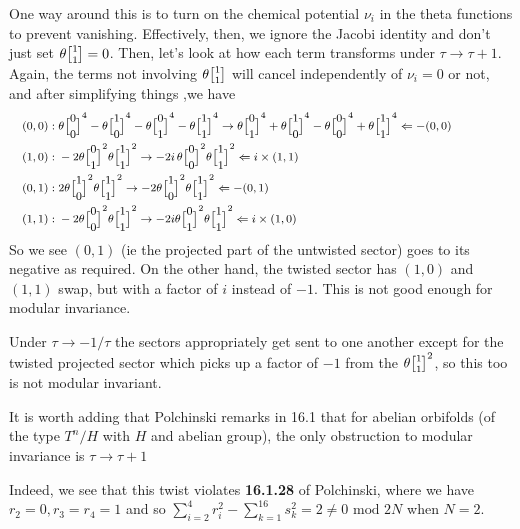 \documentclass[11pt, class=article, crop=false]{standalone}
\begin{document}
\begin{enumerate}
	One way around this is to turn on the chemical potential $\nu_i$ in the theta functions to prevent vanishing. Effectively, then, we ignore the Jacobi identity and don't just set $\theta\twist11 = 0$. Then, let's look at how each term transforms under $\tau \to \tau+1$. Again, the terms not involving $\theta\twist11$ will cancel independently of $\nu_i = 0$ or not, and after simplifying things ,we have
	\[
	\footnotesize
	\hspace{-.5in}
	\begin{aligned}
		(0,0):\;&  \theta\twist00^4 - \theta\twist10^4 - \theta\twist01^4 - \theta\twist11^4 \to \theta\twist01^4 + \theta\twist10^4 - \theta\twist00^4 + \theta\twist11^4 \Leftarrow - (0,0)\\
		(1,0):\;&   - 2 \theta \twist01^2  \theta \twist11^2 \to -2 i\, \theta \twist00^2  \theta \twist11^2  \Leftarrow i \times (1,1) \\
		(0,1):\;&  2 \theta \twist10^2 \theta \twist11^2
		\to -2 \theta \twist10^2 \theta \twist11^2 \Leftarrow -(0,1) \\
		(1,1):\;&  -2\theta \twist00^2 \theta\twist11^2  \to -2 i \theta \twist01^2 \theta\twist11^2 \Leftarrow i \times (1,0)
	\end{aligned}
	\]
	So we see $(0,1)$ (ie the projected part of the untwisted sector) goes to its negative as required. On the other hand, the twisted sector has $(1,0)$ and $(1,1)$ swap, but with a factor of $i$ instead of $-1$. This is not good enough for modular invariance. 
	
	Under $\tau \to -1/\tau$ the sectors appropriately get sent to one another except for the twisted projected sector which picks up a factor of $-1$ from the $\theta \twist11^2$, so this too is not modular invariant.
	
	It is worth adding that Polchinski remarks in 16.1 that for abelian orbifolds (of the type $T^n/H$ with $H$ and abelian group), the only obstruction to modular invariance is $\tau \to \tau+1$ 
	
	Indeed, we see that this twist violates \textbf{16.1.28} of Polchinski, where we have $r_2=0, r_3=r_4=1$ and so $\sum_{i=2}^4 r_i^2 - \sum_{k=1}^{16} s_k^2 = 2 \neq 0 \text{ mod } 2N$ when $N = 2$.
	

\end{enumerate}
\end{document}
